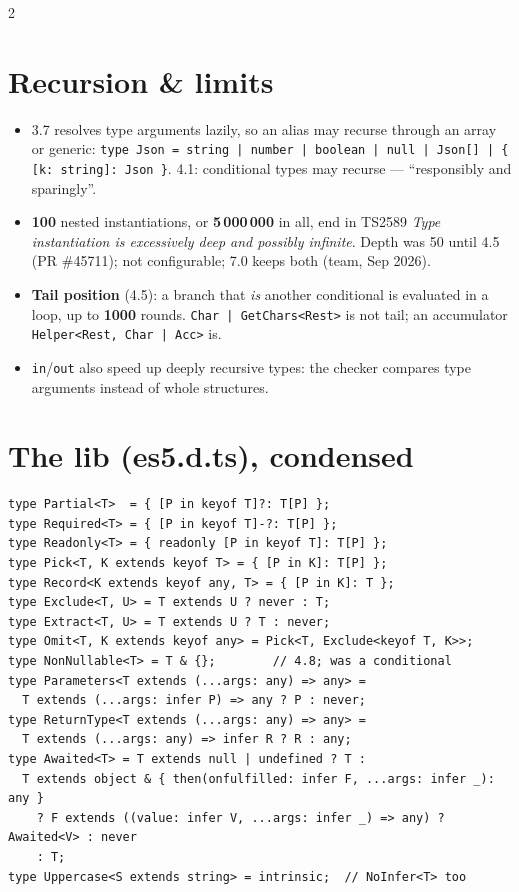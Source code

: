 \documentclass[8pt]{extarticle}
\newcommand\ct[1]{\texttt{#1}}
\begin{document}
\begin{multicols}{2}
\section{Recursion \& limits}
\begin{itemize}
  \item 3.7 resolves type arguments lazily, so an alias may recurse through an array or
        generic: \ct{type Json = string | number | boolean | null | Json[] | \{ [k: string]: Json \}}.
        4.1: conditional types may recurse — ``responsibly and sparingly''.
  \item \textbf{100} nested instantiations, or \textbf{5\,000\,000} in all, end in TS2589
        \emph{Type instantiation is excessively deep and possibly infinite}. Depth was 50 until
        4.5 (PR \#45711); not configurable; 7.0 keeps both (team, Sep 2026).
  \item \textbf{Tail position} (4.5): a branch that \emph{is} another conditional is evaluated in
        a loop, up to \textbf{1000} rounds. \ct{Char | GetChars<Rest>} is not tail; an
        accumulator \ct{Helper<Rest, Char | Acc>} is.
  \item \ct{in}/\ct{out} also speed up deeply recursive types: the checker compares type
        arguments instead of whole structures.
\end{itemize}

\section{The lib (es5.d.ts), condensed}
\begin{lstlisting}[style=ts]
type Partial<T>  = { [P in keyof T]?: T[P] };
type Required<T> = { [P in keyof T]-?: T[P] };
type Readonly<T> = { readonly [P in keyof T]: T[P] };
type Pick<T, K extends keyof T> = { [P in K]: T[P] };
type Record<K extends keyof any, T> = { [P in K]: T };
type Exclude<T, U> = T extends U ? never : T;
type Extract<T, U> = T extends U ? T : never;
type Omit<T, K extends keyof any> = Pick<T, Exclude<keyof T, K>>;
type NonNullable<T> = T & {};        // 4.8; was a conditional
type Parameters<T extends (...args: any) => any> =
  T extends (...args: infer P) => any ? P : never;
type ReturnType<T extends (...args: any) => any> =
  T extends (...args: any) => infer R ? R : any;
type Awaited<T> = T extends null | undefined ? T :
  T extends object & { then(onfulfilled: infer F, ...args: infer _): any }
    ? F extends ((value: infer V, ...args: infer _) => any) ? Awaited<V> : never
    : T;
type Uppercase<S extends string> = intrinsic;  // NoInfer<T> too
\end{lstlisting}


\end{multicols}
\end{document}
